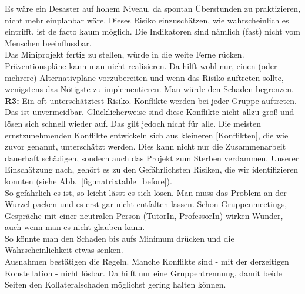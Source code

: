 \documentclass[fontsize=12pt,paper=a4,twoside]{scrartcl}
\begin{document}
Es wäre ein Desaster auf hohem Niveau, da spontan Überstunden zu praktizieren, nicht mehr einplanbar wäre. Dieses Risiko einzuschätzen, wie wahrscheinlich es eintrifft, ist de facto kaum möglich. Die Indikatoren sind nämlich (fast) nicht vom Menschen beeinflussbar.\\
Das Miniprojekt fertig zu stellen, würde in die weite Ferne rücken.\\
Präventionspläne kann man nicht realisieren. Da hilft wohl nur, einen (oder mehrere) Alternativpläne vorzubereiten und wenn das Risiko auftreten sollte, wenigstens das Nötigste zu implementieren. Man würde den Schaden begrenzen.\\ 

\textbf{R3:} Ein oft unterschätztest Risiko. Konflikte werden bei jeder Gruppe auftreten. Das ist unvermeidbar. Glücklicherweise sind diese Konflikte nicht allzu groß und lösen sich schnell wieder auf. Das gilt jedoch nicht für alle. Die meisten ernstzunehmenden Konflikte entwickeln sich aus kleineren [Konflikten], die wie zuvor genannt, unterschätzt werden. Dies kann nicht nur die Zusammenarbeit dauerhaft schädigen, sondern auch das Projekt zum Sterben verdammen. Unserer Einschätzung nach, gehört es zu den Gefährlichsten Risiken, die wir identifizieren konnten (siehe Abb.~\ref{fig:matrixtable_before}).\\

So gefährlich es ist, so leicht lässt es sich lösen. Man muss das Problem an der Wurzel packen und es erst gar nicht entfalten lassen. Schon Gruppenmeetings, Gespräche mit einer neutralen Person (TutorIn, ProfessorIn) wirken Wunder, auch wenn man es nicht glauben kann.\\
So könnte man den Schaden bis aufs Minimum drücken und die Wahrscheinlichkeit etwas senken.\\
Ausnahmen bestätigen die Regeln. Manche Konflikte sind - mit der derzeitigen Konstellation - nicht lösbar. Da hilft nur eine Gruppentrennung, damit beide Seiten den Kollateralschaden möglichst gering halten können.\\
\end{document}
